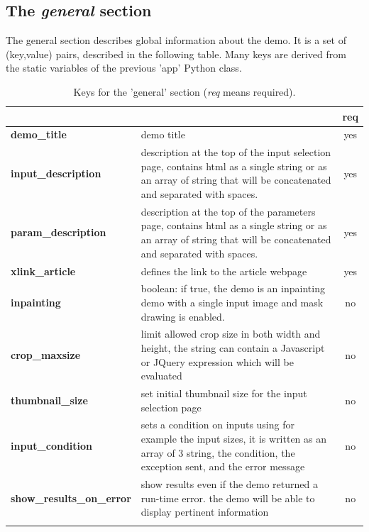 \subsection{The \emph{general} section}
The general section describes global information about the demo.
It is a set of  (key,value) pairs, described in the following table.
Many keys are derived from the static variables of the previous 'app' Python class.\\
% 
\begin{longtable}{|>{\bf}L{\linewidth}|L{\linewidth}|c|}
\hline
      &  & {\bf req} 
\tabularnewline \hline \hline
 demo\_title         & demo title & yes\\ \hline
 input\_description  & description at the top of the input selection page, 
                      contains html as a single string or as an array of string
                      that will be concatenated and separated with spaces.
                     & yes \\ \hline
 param\_description  & description at the top of the para\-meters page,
                      contains html as a single string or as an array of string
                      that will be concatenated and separated with spaces.
                      & yes
                      \\ \hline
 xlink\_article     & defines the link to the article webpage & yes  \\ \hline
 inpainting         & boolean: if true, the demo is an inpainting demo with a 
                      single input image and mask drawing is enabled. & no \\ \hline
 crop\_maxsize      & limit allowed crop size in both width and height, the string
                      can contain a Javascript or JQuery expression which will be evaluated & no \\ \hline
 thumbnail\_size    & set initial thumbnail size for the input selection page & no \\ \hline
 input\_condition   & sets a condition on inputs using for example the input sizes,
                      it is written as an array of 3 string, the condition,
                      the exception sent, and the error message& no \\ \hline
 show\_results\_on\-\_error & show results even if the demo returned a run-time error.
                    the demo will be able to display pertinent information & no \\ \hline
\caption{Keys for the 'general' section ({\em req} means required).}
\end{longtable}

